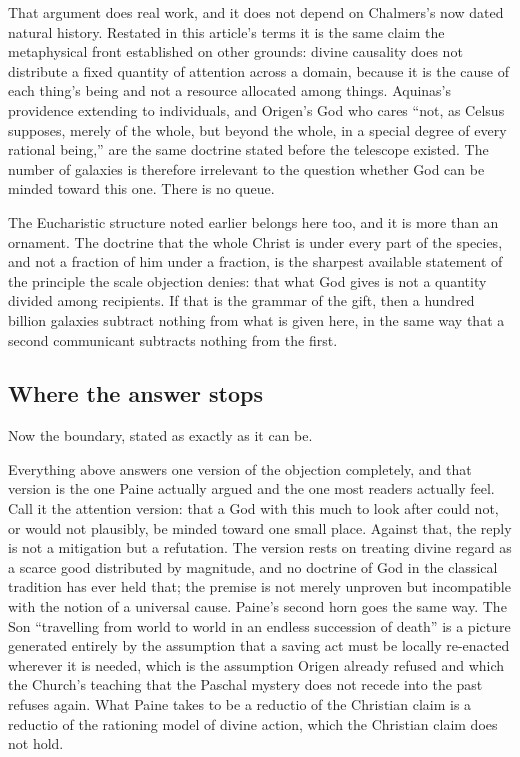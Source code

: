 That argument does real work, and it does not depend on Chalmers's now dated natural history. Restated in this article's terms it is the same claim the metaphysical front established on other grounds: divine causality does not distribute a fixed quantity of attention across a domain, because it is the cause of each thing's being and not a resource allocated among things. Aquinas's providence extending to individuals, and Origen's God who cares ``not, as Celsus supposes, merely of the whole, but beyond the whole, in a special degree of every rational being,'' are the same doctrine stated before the telescope existed. The number of galaxies is therefore irrelevant to the question whether God can be minded toward this one. There is no queue.

The Eucharistic structure noted earlier belongs here too, and it is more than an ornament. The doctrine that the whole Christ is under every part of the species, and not a fraction of him under a fraction, is the sharpest available statement of the principle the scale objection denies: that what God gives is not a quantity divided among recipients. If that is the grammar of the gift, then a hundred billion galaxies subtract nothing from what is given here, in the same way that a second communicant subtracts nothing from the first.

\subsection{Where the answer stops}

Now the boundary, stated as exactly as it can be.

Everything above answers one version of the objection completely, and that version is the one Paine actually argued and the one most readers actually feel. Call it the attention version: that a God with this much to look after could not, or would not plausibly, be minded toward one small place. Against that, the reply is not a mitigation but a refutation. The version rests on treating divine regard as a scarce good distributed by magnitude, and no doctrine of God in the classical tradition has ever held that; the premise is not merely unproven but incompatible with the notion of a universal cause. Paine's second horn goes the same way. The Son ``travelling from world to world in an endless succession of death'' is a picture generated entirely by the assumption that a saving act must be locally re-enacted wherever it is needed, which is the assumption Origen already refused and which the Church's teaching that the Paschal mystery does not recede into the past refuses again. What Paine takes to be a reductio of the Christian claim is a reductio of the rationing model of divine action, which the Christian claim does not hold.

